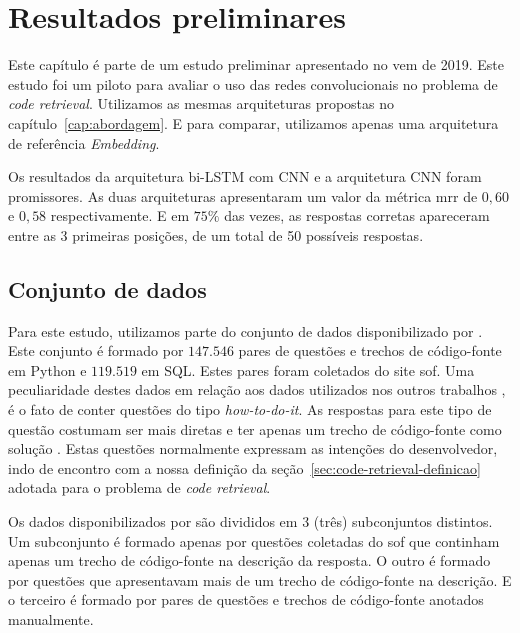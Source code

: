 \chapter{Resultados preliminares}
\label{cap:resultados-preliminares}

Este capítulo é parte de um estudo preliminar \citep{marcelo-vem-2019} apresentado no \acrfull{vem} de 2019. Este estudo foi um piloto para avaliar o uso das redes convolucionais no problema de \textit{code retrieval}. Utilizamos as mesmas arquiteturas propostas no capítulo~\ref{cap:abordagem}. E para comparar, utilizamos apenas uma arquitetura de referência \textit{Embedding}.

Os resultados da arquitetura bi-LSTM com CNN e a arquitetura CNN foram promissores. As duas arquiteturas apresentaram um valor da métrica \acrfull{mrr} de $0,60$ e $0,58$ respectivamente. E em $75\%$ das vezes, as respostas corretas apareceram entre as 3 primeiras posições, de um total de 50 possíveis respostas.

\section{Conjunto de dados}
\label{sec:conjunto-dados}

Para este estudo, utilizamos parte do conjunto de dados disponibilizado por \cite{yao-2018}. Este conjunto é formado por $\bm{147.546}$ pares de questões e trechos de código-fonte em Python e $\bm{119.519}$ em SQL. Estes pares foram coletados do site \Gls{sof}. Uma peculiaridade destes dados em relação aos dados utilizados nos outros trabalhos \cite{iyer-etal-2016-summarizing, Allamanis-bimodal-source-code-natural-language:2015}, é o fato de conter questões do tipo \textit{how-to-do-it}. As respostas para este tipo de questão costumam ser mais diretas e ter apenas um trecho de código-fonte como solução \citep{yao-2018}. Estas questões normalmente expressam as intenções do desenvolvedor, indo de encontro com a nossa definição da seção~\ref{sec:code-retrieval-definicao} adotada para o problema de \textit{code retrieval}.

Os dados disponibilizados por \cite{yao-2018} são divididos em 3 (três) subconjuntos distintos. Um subconjunto é formado apenas por questões coletadas do \Gls{sof} que continham apenas um trecho de código-fonte na descrição da resposta. O outro é formado por questões que apresentavam mais de um trecho de código-fonte na descrição. E o terceiro é formado por pares de questões e trechos de código-fonte anotados manualmente.

